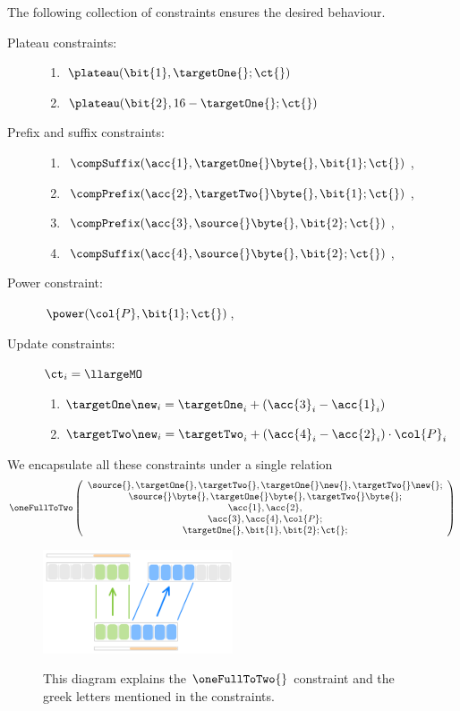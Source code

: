 The following collection of constraints ensures the desired behaviour.
\begin{description}
	\item[Plateau constraints:]
		\begin{enumerate}
			\item $\plateau(\bit{1}, \targetOne{}\mark{}; \ct{})$
			\item $\plateau(\bit{2}, 16 - \targetOne{}\mark{}; \ct{})$
		\end{enumerate}
	\item[Prefix and suffix constraints:]
		\begin{enumerate}
			\item $\compSuffix(\acc{1}, \targetOne{}\byte{}, \bit{1}; \ct{})$, %
			\item $\compPrefix(\acc{2}, \targetTwo{}\byte{}, \bit{1}; \ct{})$, %
			\item $\compPrefix(\acc{3}, \source{}\byte{}, \bit{2}; \ct{})$, %
			\item $\compSuffix(\acc{4}, \source{}\byte{}, \bit{2}; \ct{})$, %
		\end{enumerate}
	\item[Power constraint:] $\power(\col{P}, \bit{1}; \ct{})$,
	\item[Update constraints:] \If $\ct_{i} = \llargeMO$ \Then
		\begin{enumerate}
			\item $\targetOne\new_i = \targetOne_i + (\acc{3}_i - \acc{1}_i)$
			\item $\targetTwo\new_i = \targetTwo_i + (\acc{4}_i - \acc{2}_i) \cdot \col{P}_i$
		\end{enumerate}
\end{description}
We encapsulate all these constraints under a single relation
\[
	\oneFullToTwo
	\left( \begin{array}{c}
		\source{}, \targetOne{}, \targetTwo{}, \targetOne{}\new{}, \targetTwo{}\new{};\\
		\source{}\byte{}, \targetOne{}\byte{}, \targetTwo{}\byte{};\\
		\acc{1}, \acc{2},\\
		\acc{3}, \acc{4}, \col{P}; \\
		\targetOne{}\mark{}, \bit{1}, \bit{2}; \ct{};
	\end{array} \right)
\]

\begin{figure}[h!]
	\centering
	\includegraphics[width = 0.5\textwidth]{drawing/1_full_to_2}
	\label{fig: one full to two}
	\caption{This diagram explains the $\oneFullToTwo{}$ constraint and the greek letters mentioned in the constraints.}
\end{figure}
